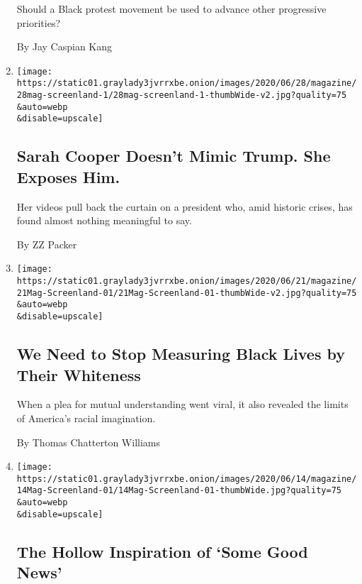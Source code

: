 \begin{enumerate}
  Should a Black protest movement be used to advance other progressive
  priorities?

  By Jay Caspian Kang
\item
  \href{/2020/06/25/magazine/sarah-cooper-doesnt-mimic-trump-she-exposes-him.html}{}

  \texttt{[image: https://static01.graylady3jvrrxbe.onion/images/2020/06/28/magazine/28mag-screenland-1/28mag-screenland-1-thumbWide-v2.jpg?quality=75\\\&auto=webp\\\&disable=upscale]}

  \hypertarget{sarah-cooper-doesnt-mimic-trump-she-exposes-him}{%
  \subsection{Sarah Cooper Doesn't Mimic Trump. She Exposes
  Him.}\label{sarah-cooper-doesnt-mimic-trump-she-exposes-him}}

  Her videos pull back the curtain on a president who, amid historic
  crises, has found almost nothing meaningful to say.

  By ZZ Packer
\item
  \href{/2020/06/18/magazine/before-you-call-the-cops-video-tyler-merritt.html}{}

  \texttt{[image: https://static01.graylady3jvrrxbe.onion/images/2020/06/21/magazine/21Mag-Screenland-01/21Mag-Screenland-01-thumbWide-v2.jpg?quality=75\\\&auto=webp\\\&disable=upscale]}

  \hypertarget{we-need-to-stop-measuring-black-lives-by-their-whiteness}{%
  \subsection{We Need to Stop Measuring Black Lives by Their
  Whiteness}\label{we-need-to-stop-measuring-black-lives-by-their-whiteness}}

  When a plea for mutual understanding went viral, it also revealed the
  limits of America's racial imagination.

  By Thomas Chatterton Williams
\item
  \href{/2020/06/11/magazine/the-hollow-inspiration-of-some-good-news.html}{}

  \texttt{[image: https://static01.graylady3jvrrxbe.onion/images/2020/06/14/magazine/14Mag-Screenland-01/14Mag-Screenland-01-thumbWide.jpg?quality=75\\\&auto=webp\\\&disable=upscale]}

  \hypertarget{the-hollow-inspiration-of-some-good-news}{%
  \subsection{The Hollow Inspiration of `Some Good
  News'}\label{the-hollow-inspiration-of-some-good-news}}


\end{enumerate}
